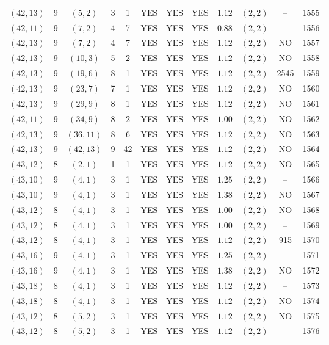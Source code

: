 \begin{longtable}{|c|c|c|c|c|c|c|c|c|c|c|c|}
$(42,13)$ & 9 & $(5,2)$ & 3 & 1 & YES & YES & YES & $1.12$ & $(2,2)$ & -- & 1555\\
$(42,11)$ & 9 & $(7,2)$ & 4 & 7 & YES & YES & YES & $0.88$ & $(2,2)$ & -- & 1556\\
$(42,13)$ & 9 & $(7,2)$ & 4 & 7 & YES & YES & YES & $1.12$ & $(2,2)$ & NO & 1557\\
$(42,13)$ & 9 & $(10,3)$ & 5 & 2 & YES & YES & YES & $1.12$ & $(2,2)$ & NO & 1558\\
$(42,13)$ & 9 & $(19,6)$ & 8 & 1 & YES & YES & YES & $1.12$ & $(2,2)$ & 2545 & 1559\\
$(42,13)$ & 9 & $(23,7)$ & 7 & 1 & YES & YES & YES & $1.12$ & $(2,2)$ & NO & 1560\\
$(42,13)$ & 9 & $(29,9)$ & 8 & 1 & YES & YES & YES & $1.12$ & $(2,2)$ & NO & 1561\\
$(42,11)$ & 9 & $(34,9)$ & 8 & 2 & YES & YES & YES & $1.00$ & $(2,2)$ & NO & 1562\\
$(42,13)$ & 9 & $(36,11)$ & 8 & 6 & YES & YES & YES & $1.12$ & $(2,2)$ & NO & 1563\\
$(42,13)$ & 9 & $(42,13)$ & 9 & 42 & YES & YES & YES & $1.12$ & $(2,2)$ & NO & 1564\\
$(43,12)$ & 8 & $(2,1)$ & 1 & 1 & YES & YES & YES & $1.12$ & $(2,2)$ & NO & 1565\\
$(43,10)$ & 9 & $(4,1)$ & 3 & 1 & YES & YES & YES & $1.25$ & $(2,2)$ & -- & 1566\\
$(43,10)$ & 9 & $(4,1)$ & 3 & 1 & YES & YES & YES & $1.38$ & $(2,2)$ & NO & 1567\\
$(43,12)$ & 8 & $(4,1)$ & 3 & 1 & YES & YES & YES & $1.00$ & $(2,2)$ & NO & 1568\\
$(43,12)$ & 8 & $(4,1)$ & 3 & 1 & YES & YES & YES & $1.00$ & $(2,2)$ & -- & 1569\\
$(43,12)$ & 8 & $(4,1)$ & 3 & 1 & YES & YES & YES & $1.12$ & $(2,2)$ & 915 & 1570\\
$(43,16)$ & 9 & $(4,1)$ & 3 & 1 & YES & YES & YES & $1.25$ & $(2,2)$ & -- & 1571\\
$(43,16)$ & 9 & $(4,1)$ & 3 & 1 & YES & YES & YES & $1.38$ & $(2,2)$ & NO & 1572\\
$(43,18)$ & 8 & $(4,1)$ & 3 & 1 & YES & YES & YES & $1.12$ & $(2,2)$ & -- & 1573\\
$(43,18)$ & 8 & $(4,1)$ & 3 & 1 & YES & YES & YES & $1.12$ & $(2,2)$ & NO & 1574\\
$(43,12)$ & 8 & $(5,2)$ & 3 & 1 & YES & YES & YES & $1.12$ & $(2,2)$ & NO & 1575\\
$(43,12)$ & 8 & $(5,2)$ & 3 & 1 & YES & YES & YES & $1.12$ & $(2,2)$ & -- & 1576\\

\end{longtable}
